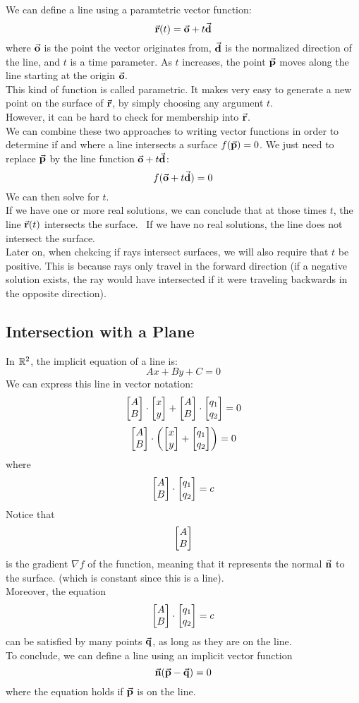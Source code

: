 \documentclass[12pt]{article}
\begin{document}
    We can define a line using a paramtetric
    vector function:
    \[ \vec{\mathbf{r}}(t) = \vec{\mathbf{o}} + t\vec{\mathbf{d}} \]
    where $\vec{\mathbf{o}}$ is the point the vector originates from,
    $\vec{\mathbf{d}}$ is the normalized direction of the line,
    and $t$ is a time parameter.
    As $t$ increases, the point $\vec{\mathbf{p}}$ moves along the
    line starting at the origin $\vec{\mathbf{o}}$. \\

    This kind of function is called parametric.
    It makes very easy to generate a new point
    on the surface of $\vec{\mathbf{r}}$,
    by simply choosing any argument $t$. \\
    However, it can be hard to check for membership
    into $\vec{\mathbf{r}}$. \\

    We can combine these two approaches to writing
    vector functions in order to 
    determine if and where a line intersects
    a surface $f(\vec{\mathbf{p}}) = 0$.
    We just need to replace
    $\vec{\mathbf{p}}$ by the line function $\vec{\mathbf{o}} + t\vec{\mathbf{d}}$:
    \[ f(\vec{\mathbf{o}} + t\vec{\mathbf{d}}) = 0 \]
    We can then solve for $t$. \\

    If we have one or more real solutions,
    we can conclude that at those times $t$,
    the line $\vec{\mathbf{r}}(t)$ intersects the surface. \
    If we have no real solutions,
    the line does not intersect the surface. \\
    
    Later on, when chekcing if rays intersect surfaces,
    we will also require that $t$ be positive.
    This is because rays only travel in the forward
    direction
    (if a negative solution exists,
    the ray would have intersected if it were traveling
    backwards in the opposite direction).

    \newpage

    \subsection*{Intersection with a Plane}

    In $\mathbb{R}^2$, the implicit equation of a line is:
    \[
        Ax + By + C = 0
    \]
    We can express this line in vector
    notation:
    \[ \begin{bmatrix} A \\ B \end{bmatrix} \cdot \begin{bmatrix} x \\ y \end{bmatrix} 
    + \begin{bmatrix} A \\ B \end{bmatrix}  \cdot \begin{bmatrix} q_1 \\ q_2 \end{bmatrix} = 0 \]
    \[ \begin{bmatrix} A \\ B \end{bmatrix}  \cdot \left( \begin{bmatrix} x \\ y \end{bmatrix}
    + \begin{bmatrix} q_1 \\ q_2 \end{bmatrix} \right) = 0 \]
    where
    \[ \begin{bmatrix} A \\ B \end{bmatrix} \cdot \begin{bmatrix} q_1 \\ q_2 \end{bmatrix} = c \]
    Notice that
    \[ \begin{bmatrix} A \\ B \end{bmatrix} \]
    is the gradient $\nabla f$ of the function,
    meaning that it represents the normal $\vec{\mathbf{n}}$
    to the surface.
    (which is constant since this is a line). \\
    Moreover, the equation 
    \[ \begin{bmatrix} A \\ B \end{bmatrix} \cdot \begin{bmatrix} q_1 \\ q_2 \end{bmatrix} = c \]
    can be satisfied by many points $\vec{\mathbf{q}}$,
    as long as they are on the line. \\
    To conclude, we can define a line
    using an implicit vector function
    \[ \vec{\mathbf{n}}(\vec{\mathbf{p}} - \vec{\mathbf{q}}) = 0 \]
    where the equation holds if $\vec{\mathbf{p}}$
    is on the line. \\
    
\end{document}

